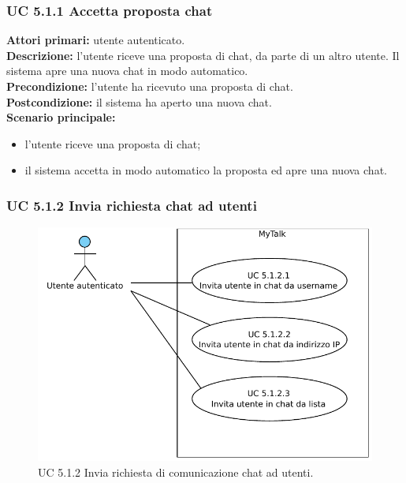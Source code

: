 \subsubsection{UC 5.1.1 Accetta proposta chat}
\noindent
\textbf{Attori primari:} utente autenticato.\\
\textbf{Descrizione:} l'utente riceve una proposta di chat, da parte di un altro utente. Il sistema apre una nuova chat in modo automatico.\\
\textbf{Precondizione:} l'utente ha ricevuto una proposta di chat.\\
\textbf{Postcondizione:} il sistema ha aperto una nuova chat.\\
\textbf{Scenario principale:}
\begin{itemize}
\item l'utente riceve una proposta di chat;
\item il sistema accetta in modo automatico la proposta ed apre una nuova chat.
\end{itemize}

\newpage

\subsubsection{UC 5.1.2 Invia richiesta chat ad utenti}

\begin{figure}[htbp]
\centering
\includegraphics[scale=0.7]{./casi_uso/UC5-1-2.pdf}
\caption{UC 5.1.2 Invia richiesta di comunicazione chat ad utenti.}
\end{figure}

